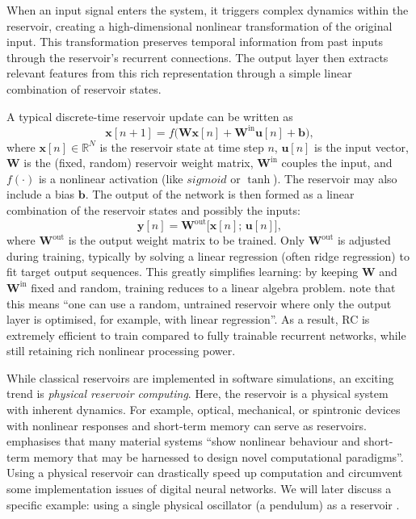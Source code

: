 \documentclass[numbered]{ivt-style/standard}
\begin{document}
When an input signal enters the system, it triggers complex dynamics within the reservoir, creating a high-dimensional nonlinear transformation of the original input. This transformation preserves temporal information from past inputs through the reservoir's recurrent connections. The output layer then extracts relevant features from this rich representation through a simple linear combination of reservoir states.

A typical discrete-time reservoir update can be written as 
\[
\mathbf{x}[n+1] = f\bigl(\mathbf{W}\mathbf{x}[n] + \mathbf{W}^{\mathrm{in}}\mathbf{u}[n] + \mathbf{b}\bigr),
\]
where $\mathbf{x}[n]\in \mathbb{R}^N$ is the reservoir state at time step $n$, $\mathbf{u}[n]$ is the input vector, $\mathbf{W}$ is the (fixed, random) reservoir weight matrix, $\mathbf{W}^{\mathrm{in}}$ couples the input, and $f(\cdot)$ is a nonlinear activation (like $sigmoid$ or $\tanh$).  The reservoir may also include a bias $\mathbf{b}$.  The output of the network is then formed as a linear combination of the reservoir states and possibly the inputs:
\[
\mathbf{y}[n] = \mathbf{W}^{\mathrm{out}}\bigl[\mathbf{x}[n];\,\mathbf{u}[n]\bigr],
\]
where $\mathbf{W}^{\mathrm{out}}$ is the output weight matrix to be trained.  Only $\mathbf{W}^{\mathrm{out}}$ is adjusted during training, typically by solving a linear regression (often ridge regression) to fit target output sequences.  This greatly simplifies learning: by keeping $\mathbf{W}$ and $\mathbf{W}^{\mathrm{in}}$ fixed and random, training reduces to a linear algebra problem.  \cite{article_RC_intro} note that this means “one can use a random, untrained reservoir where only the output layer is optimised, for example, with linear regression”.  As a result, RC is extremely efficient to train compared to fully trainable recurrent networks, while still retaining rich nonlinear processing power.


While classical reservoirs are implemented in software simulations, an exciting trend is \emph{physical reservoir computing}.  Here, the reservoir is a physical system with inherent dynamics.  For example, optical, mechanical, or spintronic devices with nonlinear responses and short-term memory can serve as reservoirs. \cite{article_RC_intro} emphasises that many material systems “show nonlinear behaviour and short-term memory that may be harnessed to design novel computational paradigms”.  Using a physical reservoir can drastically speed up computation and circumvent some implementation issues of digital neural networks.  
We will later discuss a specific example: using a single physical oscillator (a pendulum) as a reservoir \cite{Mandal2022}. 
\end{document}
